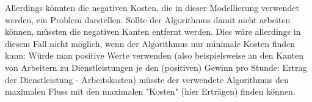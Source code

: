 \documentclass[12pt]{amsart}
\begin{document}
Allerdings könnten die negativen Kosten, die in dieser Modellierung verwendet werden, ein Problem darstellen. Sollte der Algorithmus damit nicht arbeiten können, müssten die negativen Kanten entfernt werden. Dies wäre allerdings in diesem Fall nicht möglich, wenn der Algorithmus nur minimale Kosten finden kann: Würde man positive Werte verwenden (also beispielsweise an den Kanten von Arbeitern zu Dienstleistungen je den (positiven) Gewinn pro Stunde: Ertrag der Dienstleistung - Arbeitskosten) müsste der verwendete Algorithmus den maximalen Fluss mit den maximalen "Kosten" (hier Erträgen) finden können.
\end{document}
